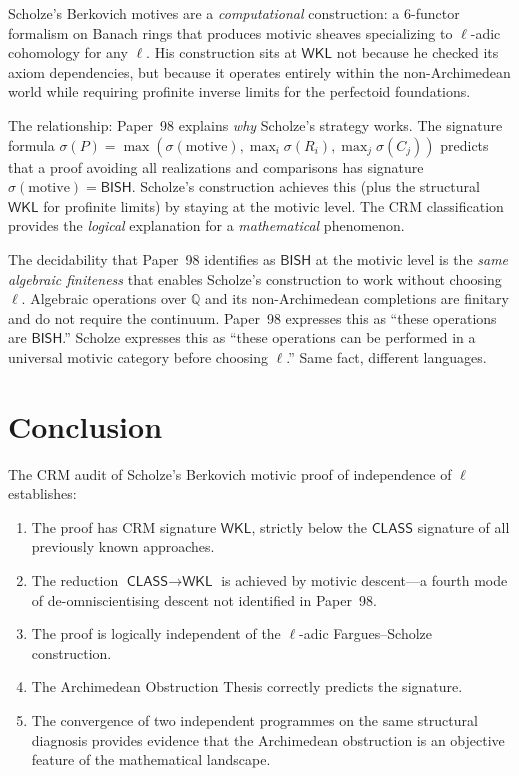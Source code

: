 \documentclass[11pt,a4paper]{article}
\theoremstyle{plain}
\theoremstyle{definition}
\newcommand{\BISH}{\textsf{BISH}}
\newcommand{\WKL}{\textsf{WKL}}
\newcommand{\CLASS}{\textsf{CLASS}}
\newcommand{\Q}{\mathbb{Q}}
\newcommand{\sig}{\sigma}
\begin{document}
Scholze's Berkovich motives are a \emph{computational} construction: a 6-functor formalism on Banach rings that produces motivic sheaves specializing to $\ell$-adic cohomology for any $\ell$. His construction sits at $\WKL$ not because he checked its axiom dependencies, but because it operates entirely within the non-Archimedean world while requiring profinite inverse limits for the perfectoid foundations.

The relationship: Paper~98 explains \emph{why} Scholze's strategy works. The signature formula $\sig(P) = \max(\sig(\text{motive}), \max_i \sig(R_i), \max_j \sig(C_j))$ predicts that a proof avoiding all realizations and comparisons has signature $\sig(\text{motive}) = \BISH$. Scholze's construction achieves this (plus the structural $\WKL$ for profinite limits) by staying at the motivic level. The CRM classification provides the \emph{logical} explanation for a \emph{mathematical} phenomenon.

The decidability that Paper~98 identifies as $\BISH$ at the motivic level is the \emph{same algebraic finiteness} that enables Scholze's construction to work without choosing $\ell$. Algebraic operations over $\Q$ and its non-Archimedean completions are finitary and do not require the continuum. Paper~98 expresses this as ``these operations are $\BISH$.'' Scholze expresses this as ``these operations can be performed in a universal motivic category before choosing $\ell$.'' Same fact, different languages.


\section{Conclusion}\label{sec:conclusion}

The CRM audit of Scholze's Berkovich motivic proof of independence of $\ell$ establishes:

\begin{enumerate}[label=(\arabic*)]
\item The proof has CRM signature $\WKL$, strictly below the $\CLASS$ signature of all previously known approaches.
\item The reduction $\CLASS \to \WKL$ is achieved by motivic descent---a fourth mode of de-omniscientising descent not identified in Paper~98.
\item The proof is logically independent of the $\ell$-adic Fargues--Scholze construction.
\item The Archimedean Obstruction Thesis correctly predicts the signature.
\item The convergence of two independent programmes on the same structural diagnosis provides evidence that the Archimedean obstruction is an objective feature of the mathematical landscape.
\end{enumerate}
\end{document}

